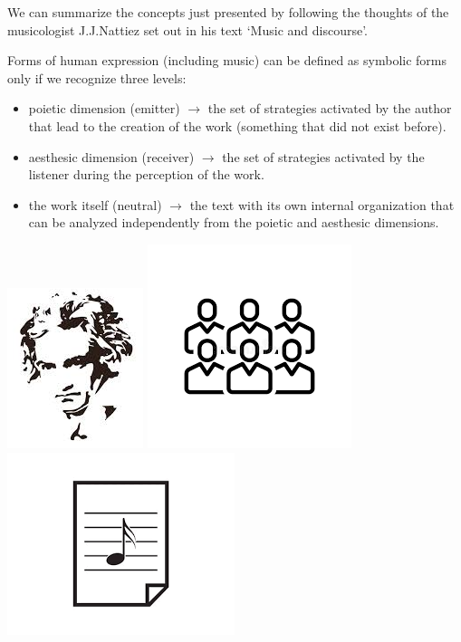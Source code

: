We can summarize the concepts just presented by following the thoughts of the musicologist J.J.Nattiez set out in his text `Music and discourse'.

Forms of human expression (including music) can be defined as symbolic forms only if we recognize three levels:

\begin{itemize}
\tightlist
\item poietic dimension (emitter) \(\rightarrow\) the set of strategies activated by the author that lead to the creation of the work (something that did not exist before).
\item aesthesic dimension (receiver) \(\rightarrow\) the set of strategies activated by the listener during the perception of the work.
\item the work itself (neutral) \(\rightarrow\) the text with its own internal organization that can be analyzed independently from the poietic and aesthesic dimensions.
\end{itemize}

\begin{center}
\includegraphics[scale=0.45]{../img/beethoven.png}
\includegraphics[scale=0.4]{../img/pubblico.png}
\includegraphics[scale=0.4]{../img/score.png}
\end{center}

